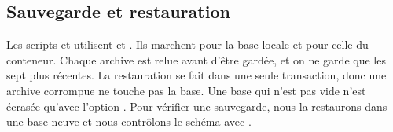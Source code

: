 \subsection{Sauvegarde et restauration}

Les scripts  et  utilisent  et . Ils marchent pour la base locale et pour celle du conteneur. Chaque archive est relue avant d'être gardée, et on ne garde que les sept plus récentes. La restauration se fait dans une seule transaction, donc une archive corrompue ne touche pas la base. Une base qui n'est pas vide n'est écrasée qu'avec l'option . Pour vérifier une sauvegarde, nous la restaurons dans une base neuve et nous contrôlons le schéma avec .
